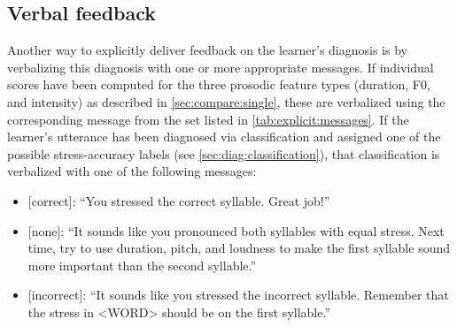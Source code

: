		\subsection{Verbal feedback}
		
		Another way to explicitly deliver feedback on the learner's diagnosis is by verbalizing this diagnosis with one or more appropriate messages. 
		If individual scores have been computed for the three prosodic feature types (duration, F0, and intensity) as described in \cref{sec:compare:single}, these are verbalized using the corresponding message from the set listed in \cref{tab:explicit:messages}.
		If the learner's utterance has been diagnosed via classification and assigned one of the possible stress-accuracy labels (see \cref{sec:diag:classification}), that classification is verbalized with one of the following messages:
		\begin{itemize}
		\item{[correct]: ``You stressed the correct syllable. Great job!''}
		\item{[none]: ``It sounds like you pronounced both syllables with equal stress. Next time, try to use duration, pitch, and loudness to make the first syllable sound more important than the second syllable.''}
		\item{[incorrect]: ``It sounds like you stressed the incorrect syllable. Remember that the stress in <WORD> should be on the first syllable.''}
		\end{itemize}
		

